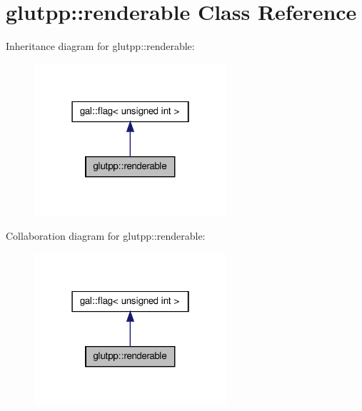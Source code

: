 \hypertarget{classglutpp_1_1renderable}{\section{glutpp\-:\-:renderable \-Class \-Reference}
\label{classglutpp_1_1renderable}
}


\-Inheritance diagram for glutpp\-:\-:renderable\-:
\nopagebreak
\begin{figure}[H]
\begin{center}
\leavevmode
\includegraphics[width=202pt]{classglutpp_1_1renderable__inherit__graph}
\end{center}
\end{figure}


\-Collaboration diagram for glutpp\-:\-:renderable\-:
\nopagebreak
\begin{figure}[H]
\begin{center}
\leavevmode
\includegraphics[width=202pt]{classglutpp_1_1renderable__coll__graph}
\end{center}
\end{figure}
